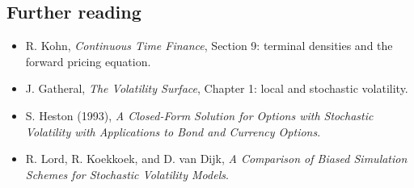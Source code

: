 \documentclass[10pt]{article}
\theoremstyle{definition}\newtheorem{definition}{Definition}[section]
\begin{document}
\subsection*{Further reading}
\begin{itemize}
\item R. Kohn, \emph{Continuous Time Finance}, Section 9: terminal densities
and the forward pricing equation.
\item J. Gatheral, \emph{The Volatility Surface}, Chapter 1: local and
stochastic volatility.
\item S. Heston (1993), \emph{A Closed-Form Solution for Options with
Stochastic Volatility with Applications to Bond and Currency Options}.
\item R. Lord, R. Koekkoek, and D. van Dijk, \emph{A Comparison of Biased
Simulation Schemes for Stochastic Volatility Models}.
\end{itemize}
\end{document}
